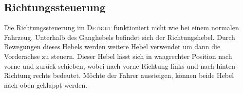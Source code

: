 \subsection{Richtungssteuerung}

Die Richtungssteuerung im \textsc{Detroit} funktioniert nicht wie bei einem normalen Fahrzeug. Unterhalb des Ganghebels befindet sich der Richtungshebel. Durch Bewegungen dieses Hebels werden weitere Hebel verwendet um dann die Vorderachse zu steuern. Dieser Hebel lässt sich in waagrechter Position nach vorne und zurück schieben, wobei nach vorne Richtung links und nach hinten Richtung rechts bedeutet. Möchte der Fahrer aussteigen, können beide Hebel nach oben geklappt werden.


\newpage